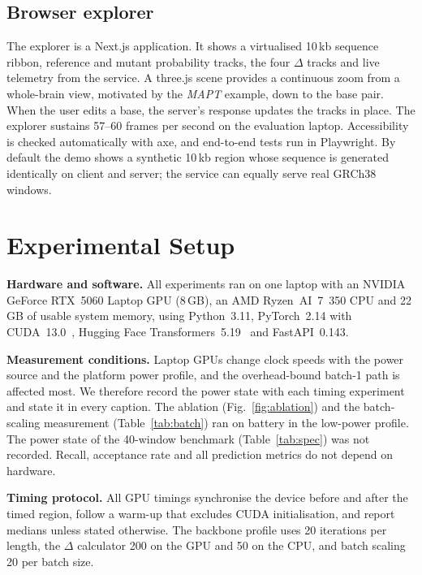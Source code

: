 \documentclass[conference]{IEEEtran}
\begin{document}
\subsection{Browser explorer}
The explorer is a Next.js application. It shows a virtualised 10\,kb sequence ribbon, reference and mutant probability tracks, the four $\Delta$ tracks and live telemetry from the service. A three.js scene provides a continuous zoom from a whole-brain view, motivated by the \textit{MAPT} example, down to the base pair. When the user edits a base, the server's response updates the tracks in place. The explorer sustains 57--60 frames per second on the evaluation laptop. Accessibility is checked automatically with axe, and end-to-end tests run in Playwright. By default the demo shows a synthetic 10\,kb region whose sequence is generated identically on client and server; the service can equally serve real GRCh38 windows.

\section{Experimental Setup}\label{sec:setup}
\textbf{Hardware and software.} All experiments ran on one laptop with an NVIDIA GeForce RTX~5060 Laptop GPU (8\,GB), an AMD Ryzen~AI~7~350 CPU and 22\,GB of usable system memory, using Python~3.11, PyTorch~2.14 with CUDA~13.0~\cite{paszke2019pytorch}, Hugging Face Transformers~5.19~\cite{wolf2020transformers} and FastAPI~0.143.

\textbf{Measurement conditions.} Laptop GPUs change clock speeds with the power source and the platform power profile, and the overhead-bound batch-1 path is affected most. We therefore record the power state with each timing experiment and state it in every caption. The ablation (Fig.~\ref{fig:ablation}) and the batch-scaling measurement (Table~\ref{tab:batch}) ran on battery in the low-power profile. The power state of the 40-window benchmark (Table~\ref{tab:spec}) was not recorded. Recall, acceptance rate and all prediction metrics do not depend on hardware.

\textbf{Timing protocol.} All GPU timings synchronise the device before and after the timed region, follow a warm-up that excludes CUDA initialisation, and report medians unless stated otherwise. The backbone profile uses 20 iterations per length, the $\Delta$ calculator 200 on the GPU and 50 on the CPU, and batch scaling 20 per batch size.
\end{document}
